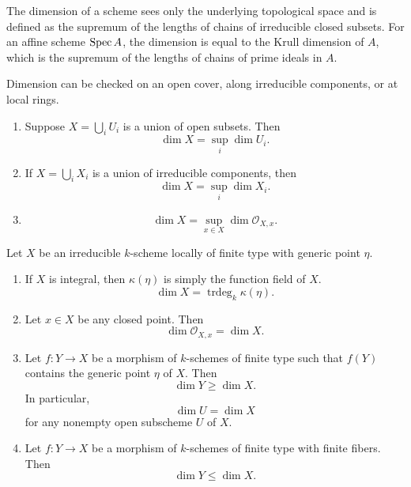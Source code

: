 \documentclass[12pt]{article}
\begin{document}
The dimension of a scheme sees only the underlying topological space and is defined as the supremum of the lengths of chains of irreducible closed subsets. For an affine scheme \(\operatorname{Spec} A\), the dimension is equal to the Krull dimension of \(A\), which is the supremum of the lengths of chains of prime ideals in \(A\).

Dimension can be checked on an open cover, along irreducible components, or at local rings.
\begin{proposition}\leavevmode
    \begin{enumerate}
        \item Suppose \(X=\bigcup_i U_i\) is a union of open subsets. Then
              \[\dim X = \sup_i \dim U_i.\]
        \item If \(X=\bigcup_i X_i\) is a union of irreducible components, then
              \[\dim X = \sup_i \dim X_i.\]
        \item
              \[\dim X = \sup_{x\in X} \dim \mathcal O_{X,x}.\]
    \end{enumerate}
\end{proposition}

\begin{theorem}
    Let \(X\) be an irreducible \(k\)-scheme locally of finite type with generic point \(\eta\).

    \begin{enumerate}
        \item If \(X\) is integral, then \(\kappa(\eta)\) is simply the function field of \(X\).
              \[
                  \dim X = \operatorname{trdeg}_k \kappa(\eta).
              \]

        \item Let \(x\in X\) be any closed point. Then
              \[
                  \dim \mathcal O_{X,x} = \dim X.
              \]

        \item Let \(f:Y\to X\) be a morphism of \(k\)-schemes of finite type such that \(f(Y)\) contains the generic point \(\eta\) of \(X\). Then
              \[
                  \dim Y \geq \dim X.
              \]
              In particular,
              \[
                  \dim U = \dim X
              \]
              for any nonempty open subscheme \(U\) of \(X\).

        \item Let \(f:Y\to X\) be a morphism of \(k\)-schemes of finite type with finite fibers. Then
              \[
                  \dim Y \leq \dim X.
              \]
    \end{enumerate}
\end{theorem}
\end{document}
